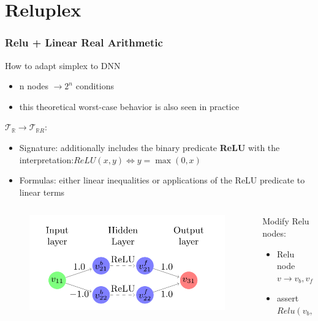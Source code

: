 \documentclass[aspectratio=169%
,serif,mathserif]{beamer}
\begin{document}
\section{Reluplex}
\begin{frame}
	\frametitle{Relu + Linear Real Arithmetic}
	How to adapt simplex to DNN 
	\begin{itemize}
		\item n nodes $\to 2^n$ conditions
		\item this theoretical worst-case behavior is also seen in practice	
	\end{itemize}
\end{frame}

\begin{frame}
	$\mathcal{T}_{\mathbb{R}} \to \mathcal{T}_{\mathbb{R} R}$:
	\begin{itemize}
		\item Signature: additionally includes the binary predicate \textbf{ReLU} with the interpretation:$ReLU(x, y) \iff y =\max(0, x)$
		\item Formulas: either linear inequalities or applications of the ReLU predicate to linear terms
	\end{itemize}
\end{frame}


\begin{frame}
	\begin{columns}
		\begin{column}{.65\textwidth}
			\begin{figure}[htbp]
				\includegraphics[width=1\linewidth]{4.png}
			\end{figure}
		\end{column}

		\begin{column}{.35\textwidth}
			Modify Relu nodes:
			\begin{itemize}
				\item Relu node $v \to v_b,v_f$
				\item assert $Relu(v_b,v_f)$
			\end{itemize}
		\end{column}
	\end{columns}
\end{frame}
\end{document}
